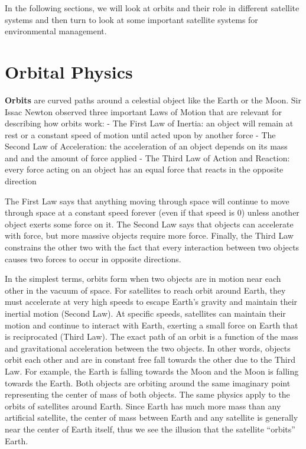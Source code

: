 \documentclass[
]{book}
\begin{document}
In the following sections, we will look at orbits and their role in different satellite systems and then turn to look at some important satellite systems for environmental management.

\hypertarget{orbital-physics}{%
\section{Orbital Physics}\label{orbital-physics}}

\textbf{Orbits} are curved paths around a celestial object like the Earth or the Moon. Sir Issac Newton observed three important Laws of Motion that are relevant for describing how orbits work:
- The First Law of Inertia: an object will remain at rest or a constant speed of motion until acted upon by another force
- The Second Law of Acceleration: the acceleration of an object depends on its mass and and the amount of force applied
- The Third Law of Action and Reaction: every force acting on an object has an equal force that reacts in the opposite direction

The First Law says that anything moving through space will continue to move through space at a constant speed forever (even if that speed is 0) unless another object exerts some force on it. The Second Law says that objects can accelerate with force, but more massive objects require more force. Finally, the Third Law constrains the other two with the fact that every interaction between two objects causes two forces to occur in opposite directions.

In the simplest terms, orbits form when two objects are in motion near each other in the vacuum of space. For satellites to reach orbit around Earth, they must accelerate at very high speeds to escape Earth's gravity and maintain their inertial motion (Second Law). At specific speeds, satellites can maintain their motion and continue to interact with Earth, exerting a small force on Earth that is reciprocated (Third Law). The exact path of an orbit is a function of the mass and gravitational acceleration between the two objects. In other words, objects orbit each other and are in constant free fall towards the other due to the Third Law. For example, the Earth is falling towards the Moon and the Moon is falling towards the Earth. Both objects are orbiting around the same imaginary point representing the center of mass of both objects. The same physics apply to the orbits of satellites around Earth. Since Earth has much more mass than any artificial satellite, the center of mass between Earth and any satellite is generally near the center of Earth itself, thus we see the illusion that the satellite ``orbits'' Earth.
\end{document}
